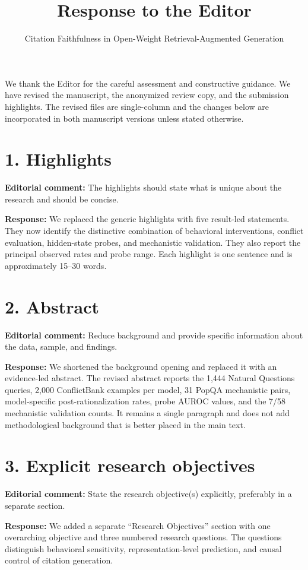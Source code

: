 \documentclass[11pt]{article}
\title{Response to the Editor}
\author{Citation Faithfulness in Open-Weight Retrieval-Augmented Generation}
\date{}
\begin{document}
\maketitle

We thank the Editor for the careful assessment and constructive guidance. We have revised the manuscript, the anonymized review copy, and the submission highlights. The revised files are single-column and the changes below are incorporated in both manuscript versions unless stated otherwise.

\section*{1. Highlights}

\textbf{Editorial comment:} The highlights should state what is unique about the research and should be concise.

\textbf{Response:} We replaced the generic highlights with five result-led statements. They now identify the distinctive combination of behavioral interventions, conflict evaluation, hidden-state probes, and mechanistic validation. They also report the principal observed rates and probe range. Each highlight is one sentence and is approximately 15--30 words.

\section*{2. Abstract}

\textbf{Editorial comment:} Reduce background and provide specific information about the data, sample, and findings.

\textbf{Response:} We shortened the background opening and replaced it with an evidence-led abstract. The revised abstract reports the 1,444 Natural Questions queries, 2,000 ConflictBank examples per model, 31 PopQA mechanistic pairs, model-specific post-rationalization rates, probe AUROC values, and the 7/58 mechanistic validation counts. It remains a single paragraph and does not add methodological background that is better placed in the main text.

\section*{3. Explicit research objectives}

\textbf{Editorial comment:} State the research objective(s) explicitly, preferably in a separate section.

\textbf{Response:} We added a separate ``Research Objectives'' section with one overarching objective and three numbered research questions. The questions distinguish behavioral sensitivity, representation-level prediction, and causal control of citation generation.
\end{document}
